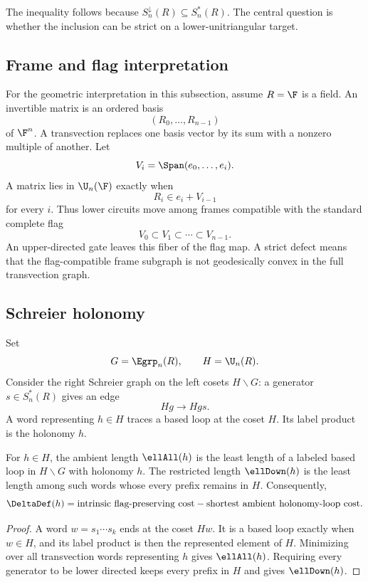 The inequality follows because $S_n^\downarrow(R)\subseteq S_n^*(R)$.  The central question is whether the inclusion can be strict on a lower-unitriangular target.

\subsection{Frame and flag interpretation}

For the geometric interpretation in this subsection, assume $R=\F$ is a field.  An invertible matrix is an ordered basis
\[
(R_0,\ldots,R_{n-1})
\]
of $\F^n$.  A transvection replaces one basis vector by its sum with a nonzero multiple of another.  Let
\[
V_i=\Span(e_0,\ldots,e_i).
\]
A matrix lies in $\U_n(\F)$ exactly when
\[
R_i\in e_i+V_{i-1}
\]
for every $i$.  Thus lower circuits move among frames compatible with the standard complete flag
\[
V_0\subset V_1\subset\cdots\subset V_{n-1}.
\]
An upper-directed gate leaves this fiber of the flag map.  A strict defect means that the flag-compatible frame subgraph is not geodesically convex in the full transvection graph.

\subsection{Schreier holonomy}

Set
\[
G=\Egrp_n(R),
\qquad
H=\U_n(R).
\]
Consider the right Schreier graph on the left cosets $H\backslash G$: a generator $s\in S_n^*(R)$ gives an edge
\[
Hg\longrightarrow Hgs.
\]
A word representing $h\in H$ traces a based loop at the coset $H$.  Its label product is the holonomy $h$.

\begin{proposition}\label{prop:schreier-holonomy}
For $h\in H$, the ambient length $\ellAll(h)$ is the least length of a labeled based loop in $H\backslash G$ with holonomy $h$.  The restricted length $\ellDown(h)$ is the least length among such words whose every prefix remains in $H$.  Consequently,
\[
\DeltaDef(h)
=
\text{intrinsic flag-preserving cost}
-
\text{shortest ambient holonomy-loop cost}.
\]
\end{proposition}

\begin{proof}
A word $w=s_1\cdots s_k$ ends at the coset $Hw$.  It is a based loop exactly when $w\in H$, and its label product is then the represented element of $H$.  Minimizing over all transvection words representing $h$ gives $\ellAll(h)$.  Requiring every generator to be lower directed keeps every prefix in $H$ and gives $\ellDown(h)$.
\end{proof}

